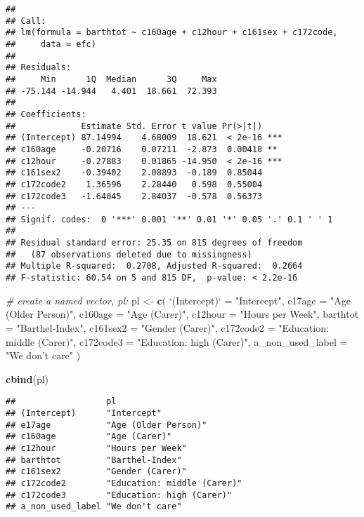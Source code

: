 \documentclass[]{article}
\newenvironment{Shaded}{\begin{snugshade}}{\end{snugshade}}
\newcommand{\KeywordTok}[1]{\textcolor[rgb]{0.13,0.29,0.53}{\textbf{#1}}}
\newcommand{\DataTypeTok}[1]{\textcolor[rgb]{0.13,0.29,0.53}{#1}}
\newcommand{\StringTok}[1]{\textcolor[rgb]{0.31,0.60,0.02}{#1}}
\newcommand{\CommentTok}[1]{\textcolor[rgb]{0.56,0.35,0.01}{\textit{#1}}}
\newcommand{\NormalTok}[1]{#1}
\begin{document}
\begin{verbatim}
## 
## Call:
## lm(formula = barthtot ~ c160age + c12hour + c161sex + c172code, 
##     data = efc)
## 
## Residuals:
##     Min      1Q  Median      3Q     Max 
## -75.144 -14.944   4.401  18.661  72.393 
## 
## Coefficients:
##             Estimate Std. Error t value Pr(>|t|)    
## (Intercept) 87.14994    4.68009  18.621  < 2e-16 ***
## c160age     -0.20716    0.07211  -2.873  0.00418 ** 
## c12hour     -0.27883    0.01865 -14.950  < 2e-16 ***
## c161sex2    -0.39402    2.08893  -0.189  0.85044    
## c172code2    1.36596    2.28440   0.598  0.55004    
## c172code3   -1.64045    2.84037  -0.578  0.56373    
## ---
## Signif. codes:  0 '***' 0.001 '**' 0.01 '*' 0.05 '.' 0.1 ' ' 1
## 
## Residual standard error: 25.35 on 815 degrees of freedom
##   (87 observations deleted due to missingness)
## Multiple R-squared:  0.2708, Adjusted R-squared:  0.2664 
## F-statistic: 60.54 on 5 and 815 DF,  p-value: < 2.2e-16
\end{verbatim}

\begin{Shaded}
\begin{Highlighting}[]
\CommentTok{# create a named vector, pl:}
\NormalTok{pl <-}\StringTok{ }\KeywordTok{c}\NormalTok{(}
  \StringTok{`}\DataTypeTok{(Intercept)}\StringTok{`}\NormalTok{ =}\StringTok{ "Intercept"}\NormalTok{,}
  \DataTypeTok{e17age =} \StringTok{"Age (Older Person)"}\NormalTok{,}
  \DataTypeTok{c160age =} \StringTok{"Age (Carer)"}\NormalTok{,}
  \DataTypeTok{c12hour =} \StringTok{"Hours per Week"}\NormalTok{,}
  \DataTypeTok{barthtot =} \StringTok{"Barthel-Index"}\NormalTok{,}
  \DataTypeTok{c161sex2 =} \StringTok{"Gender (Carer)"}\NormalTok{,}
  \DataTypeTok{c172code2 =} \StringTok{"Education: middle (Carer)"}\NormalTok{,}
  \DataTypeTok{c172code3 =} \StringTok{"Education: high (Carer)"}\NormalTok{,}
  \DataTypeTok{a_non_used_label =} \StringTok{"We don't care"}
\NormalTok{)}

\KeywordTok{cbind}\NormalTok{(pl)}
\end{Highlighting}
\end{Shaded}

\begin{verbatim}
##                  pl                         
## (Intercept)      "Intercept"                
## e17age           "Age (Older Person)"       
## c160age          "Age (Carer)"              
## c12hour          "Hours per Week"           
## barthtot         "Barthel-Index"            
## c161sex2         "Gender (Carer)"           
## c172code2        "Education: middle (Carer)"
## c172code3        "Education: high (Carer)"  
## a_non_used_label "We don't care"
\end{verbatim}
\end{document}
